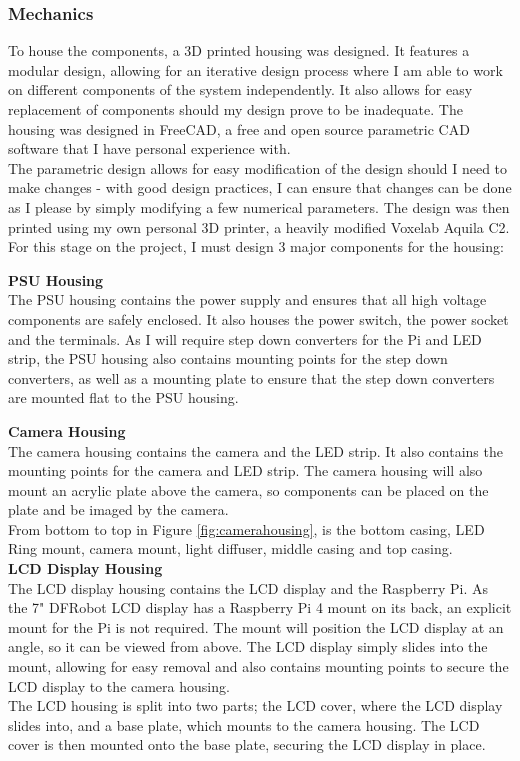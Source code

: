 \subsubsection{Mechanics} \label{sec:mechanics}
To house the components, a 3D printed housing was designed. It features a modular design, allowing for an iterative design process
where I am able to work on different components of the system independently. It also allows for easy replacement of components
should my design prove to be inadequate. The housing was designed in FreeCAD\cite{freecad}, a free and open source parametric CAD software 
that I have personal experience with. \\
The parametric design allows for easy modification of the design should I need to make changes -
with good design practices, I can ensure that changes can be done as I please by simply modifying a few numerical parameters.
The design was then printed using my own personal 3D printer, a heavily modified Voxelab Aquila C2. For this stage on the project,
I must design 3 major components for the housing:

\noindent
\textbf{PSU Housing} \\
The PSU housing contains the power supply and ensures that all high voltage components are safely enclosed.
It also houses the power switch, the power socket and the terminals. As I will require step down converters for the Pi and LED strip,
the PSU housing also contains mounting points for the step down converters, as well as a mounting plate to ensure that the step down converters
are mounted flat to the PSU housing.

\noindent
\textbf{Camera Housing} \\
\label{sec:camerahousing}
The camera housing contains the camera and the LED strip. It also contains the mounting points for the camera and LED strip.
The camera housing will also mount an acrylic plate above the camera, so components can be placed on the plate and be imaged by the camera. \\
From bottom to top in Figure \ref*{fig:camerahousing}, is the bottom casing, LED Ring mount, camera mount, light diffuser, middle casing and
top casing. \\

\noindent
\textbf{LCD Display Housing} \\
\label{sec:lcdhousing}
The LCD display housing contains the LCD display and the Raspberry Pi. As the 7" DFRobot LCD display has a Raspberry Pi 4 mount on its back,
an explicit mount for the Pi is not required. The mount will position the LCD display at an angle, so it can be viewed from above. The LCD display
simply slides into the mount, allowing for easy removal and also contains mounting points to secure the LCD display to the camera housing. \\
The LCD housing is split into two parts; the LCD cover, where the LCD display slides into, and a base plate, which mounts to the camera housing.
The LCD cover is then mounted onto the base plate, securing the LCD display in place.

